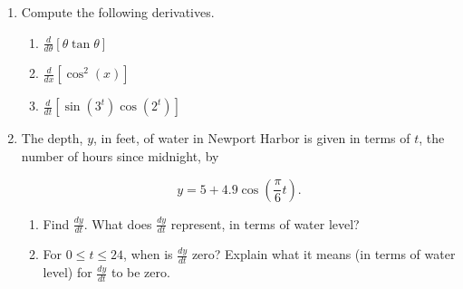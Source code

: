 \documentclass[12pt]{article}
\begin{document}
\begin{enumerate}
\item  Compute the following derivatives. 
\begin{enumerate}
	\item $\displaystyle \frac{d}{d\theta}\left[\theta\tan\theta\right]$
	\vfill
	\item $\displaystyle \frac{d}{dx}\left[\cos^{2}\left(x\right)\right]$
	\vfill
	\item $\displaystyle \frac{d}{dt}\left[\sin\left(3^{t}\right)\cos\left(2^{t}\right)\right]$
	\vfill
	\end{enumerate}

\vfill
\item The depth, $y$, in feet, of water in Newport Harbor is given in terms of $t$, the number of hours since midnight, by

$$y=5+4.9\cos\left(\frac{\pi}{6}t\right).$$
	\begin{enumerate}
	\item  Find $\displaystyle \frac{dy}{dt}$. What does $\displaystyle \frac{dy}{dt}$ represent, in terms of water level?
	
	\vfill
	\item For $0\le t\le24$, when is $\displaystyle \frac{dy}{dt}$ zero?  Explain what it means (in terms of water level) for $\displaystyle \frac{dy}{dt}$ to be zero.
	\end{enumerate}

\end{enumerate}
\end{document}
